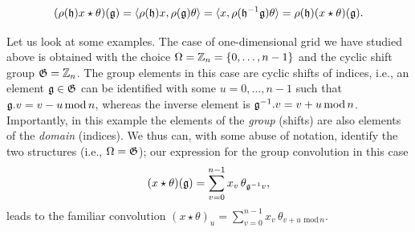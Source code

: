 \begin{equation*}
    (\rho({\mathfrak{h}}) x \star \theta)({\mathfrak{g}})
    = \langle \rho({\mathfrak{h}}) x, \rho({\mathfrak{g}}) \theta \rangle
    = \langle x, \rho({\mathfrak{h}}^{-1} {\mathfrak{g}}) \theta \rangle
    = \rho({\mathfrak{h}}) (x \star \theta)({\mathfrak{g}}).
\end{equation*}



Let us look at some examples. 
The case of one-dimensional grid we have studied above is obtained with the choice 
$\Omega = \mathbb{Z}_n = \{0, \ldots, n-1\}$ and the cyclic shift group ${\mathfrak{G}} = \mathbb{Z}_n$. 
%
The group elements in this case are cyclic shifts of indices, i.e., an element ${\mathfrak{g}} \in {\mathfrak{G}}$ can be identified with some $u = 0,\hdots, n-1$ such that ${\mathfrak{g}}. v = v - u \, \mathrm{mod} \, n$, whereas the inverse element is ${\mathfrak{g}}^{-1}. v = v + u \, \mathrm{mod} \, n$. Importantly, in this example the elements of the {\em group} (shifts) are also elements of the {\em domain} (indices).   
%
%
We thus can, with some abuse of notation, identify the two structures (i.e., $\Omega = {\mathfrak{G}}$); our expression for the group convolution in this case 
$$
(x \star \theta)({\mathfrak{g}}) =  \sum_{v=0}^{n-1} x_v \, \theta_{{\mathfrak{g}}^{-1} v},
$$
leads to the familiar convolution  $\displaystyle (x\star \theta)_u = \sum_{v=0}^{n-1} x_v \, \theta_{v + u\,\, \mathrm{mod} \, n}$. 



